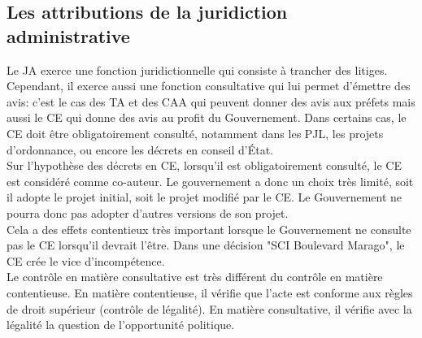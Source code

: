 \documentclass[10pt, a4paper, openany]{book}
\begin{document}
\subsection{Les attributions de la juridiction administrative}

Le JA exerce une fonction juridictionnelle qui consiste à trancher des litiges. Cependant, il exerce aussi une fonction consultative qui lui permet d'émettre des avis: c'est le cas des TA et des CAA qui peuvent donner des avis aux préfets mais aussi le CE qui donne des avis au profit du Gouvernement. Dans certains cas, le CE doit être obligatoirement consulté, notamment dans les PJL, les projets d'ordonnance, ou encore les décrets en conseil d'État. \\
Sur l'hypothèse des décrets en CE, lorsqu'il est obligatoirement consulté, le CE est considéré comme co-auteur. Le gouvernement a donc un choix très limité, soit il adopte le projet initial, soit le projet modifié par le CE. Le Gouvernement ne pourra donc pas adopter d'autres versions de son projet. \\
Cela a des effets contentieux très important lorsque le Gouvernement ne consulte pas le CE lorsqu'il devrait l'être. Dans une décision "SCI Boulevard Marago", le CE crée le vice d'incompétence. \\
Le contrôle en matière consultative est très différent du contrôle en matière contentieuse. En matière contentieuse, il vérifie que l'acte est conforme aux règles de droit supérieur (contrôle de légalité). En matière consultative, il vérifie avec la légalité la question de l'opportunité politique. 
\end{document}
